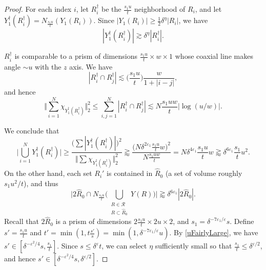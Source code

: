 \documentclass[letterpaper, reqno,11pt]{article}
\numberwithin{equation}{section}
\newcommand{\eps}{\varepsilon}
\numberwithin{thm}{section}
\theoremstyle{remark}
\begin{document}
\begin{proof}
For each index $i$, let $R_i^\dag$ be the $\frac{s_1 u}{t}$ neighborhood of $R_i$, and let $Y_1^\dag( R_i^\dag) = N_{\frac{s_1u}{t}}(Y_1(R_i))$. Since $|Y_1(R_i)|\geq \frac{1}{2}\delta^{\eta}|R_i|$, we have 
\begin{equation}\label{tildeY3Full}
| Y_1^\dag(R_i^\dag)|\gtrsim \delta^{\eta}| R_i^\dag|.
\end{equation}

$R_i^\dag$ is comparable to a prism of dimensions $\frac{s_1 u}{t}\times w\times 1$ whose coaxial line makes angle $\sim u$ with the $z$ axis. We have 
\[
|R_i^\dag\cap R_j^\dag|\lesssim \big(\frac{s_1 u}{t}\big)\frac{w}{1+|i-j|},
\]
and hence
\[
\Big\Vert \sum_{i=1}^N \chi_{Y_1^\dag(R_i^\dag)}\Big\Vert_2^2 \leq \sum_{i,j=1}^N|R_i^\dag\cap R_j^\dag|\lesssim N\frac{s_1 u w}{t}|\log(u/w)|.
\]

We conclude that 
\begin{equation}\label{CordobaTypeComputation}
\Big|\bigcup_{i=1}^N  Y_1^\dag( R_i^\dag) \Big| 
\geq \frac{\Big(\sum  |Y_1^\dag( R_i^\dag)|\Big)^2}{\Big\Vert \sum \chi_{Y_1^\dag(R_i^\dag)}\Big\Vert_2^2}
\gtrapprox \frac{\Big(N \delta^{2\eps_1} \frac{s_1 u}{t} w\Big)^2}{N\frac{s_1 u w}{t}}
%
=N\delta^{4\eps_1}\frac{s_1 u}{t} w
\gtrapprox \delta^{6\eps_1}\frac{s_1}{t}u^2.
\end{equation}
On the other hand, each set $R_i'$ is contained in $\hat R_0$ (a set of volume roughly $s_1u^2/t$), and thus
\begin{equation}\label{hatR0Full}
\Big| 2\hat R_0 \cap N_{\frac{s_1 u}{t}}\Big(\bigcup_{\substack{R\in\mathcal{R} \\ R\subset \hat R_0}}Y(R)\Big)\Big| \gtrapprox \delta^{6\eps_1}|2\hat R_0|.
\end{equation}
Recall that $2\hat R_0$ is a prism of dimensions $2\frac{s_1 u}{t}  \times 2 u\times 2$, and $s_1 = \delta^{-7\eps_1/\eps}s$. Define $s'=\frac{s_1u}{t}$ and $t'=\min(1, t\frac{s'}{s})=\min(1, \delta^{-7\eps_1/\eps}u)$. By \eqref{uFairlyLarge}, we have $s'\in [\delta^{-\eps^2/4}s, \frac{s_1}{t}]$. Since $s\leq\delta^\eps t$, we can select $\eta$ sufficiently small so that $\frac{s_1}{t}\leq \delta^{\eps/2}$, and hence $s'\in [\delta^{-\eps^2/4}s, \delta^{\eps/2}]$.


\end{proof}
\end{document}
